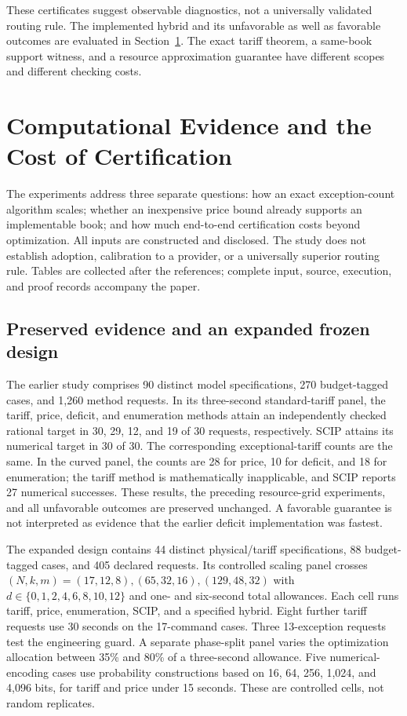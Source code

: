 \documentclass[11pt,letterpaper]{article}
\theoremstyle{definition}\newtheorem{remark}[theorem]{Remark}
\begin{document}
These certificates suggest observable diagnostics, not a universally validated routing rule. The implemented hybrid and its unfavorable as well as favorable outcomes are evaluated in Section~\ref{sec:study59}. The exact tariff theorem, a same-book support witness, and a resource approximation guarantee have different scopes and different checking costs.
\section{Computational Evidence and the Cost of Certification}\label{sec:study59}
The experiments address three separate questions: how an exact exception-count algorithm scales; whether an inexpensive price bound already supports an implementable book; and how much end-to-end certification costs beyond optimization. All inputs are constructed and disclosed. The study does not establish adoption, calibration to a provider, or a universally superior routing rule. Tables are collected after the references; complete input, source, execution, and proof records accompany the paper.

\subsection{Preserved evidence and an expanded frozen design}
The earlier study comprises 90 distinct model specifications, 270 budget-tagged cases, and 1,260 method requests. In its three-second standard-tariff panel, the tariff, price, deficit, and enumeration methods attain an independently checked rational target in 30, 29, 12, and 19 of 30 requests, respectively. SCIP attains its numerical target in 30 of 30. The corresponding exceptional-tariff counts are the same. In the curved panel, the counts are 28 for price, 10 for deficit, and 18 for enumeration; the tariff method is mathematically inapplicable, and SCIP reports 27 numerical successes. These results, the preceding resource-grid experiments, and all unfavorable outcomes are preserved unchanged. A favorable guarantee is not interpreted as evidence that the earlier deficit implementation was fastest.

The expanded design contains 44 distinct physical/tariff specifications, 88 budget-tagged cases, and 405 declared requests. Its controlled scaling panel crosses $(N,k,m)=(17,12,8),(65,32,16),(129,48,32)$ with $d\in\{0,1,2,4,6,8,10,12\}$ and one- and six-second total allowances. Each cell runs tariff, price, enumeration, SCIP, and a specified hybrid. Eight further tariff requests use 30 seconds on the 17-command cases. Three 13-exception requests test the engineering guard. A separate phase-split panel varies the optimization allocation between 35\% and 80\% of a three-second allowance. Five numerical-encoding cases use probability constructions based on 16, 64, 256, 1,024, and 4,096 bits, for tariff and price under 15 seconds. These are controlled cells, not random replicates.
\end{document}
